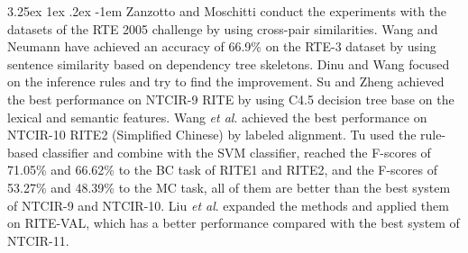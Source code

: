 \documentclass[12pt]{article}
\makeatletter
\renewcommand\paragraph{\@startsection{paragraph}{5}{\z@}%
  {3.25ex \@plus1ex \@minus.2ex}%
  {-1em}%
  {\normalfont\normalsize\bfseries}}
\makeatother
\begin{document}
\begin{CJK*}{UTF8}{bkai}
\begin{spacing}{1.77}
\paragraph{}
Zanzotto and Moschitti \cite{zanzotto_moschitti_2006} conduct the experiments with the datasets of the RTE 2005 challenge by using cross-pair similarities. Wang and Neumann \cite{wang_neumann_2007} have achieved an accuracy of 66.9\% on the RTE-3 dataset by using sentence similarity based on dependency tree skeletons. Dinu and Wang \cite{dinu_wang_2009} focused on the inference rules and try to find the improvement. Su and Zheng \cite{su_zheng_2011} achieved the best performance on NTCIR-9 RITE by using C4.5 decision tree base on the lexical and semantic features. Wang \emph{et al}. \cite{wang-etal-2013-labeled} achieved the best performance on NTCIR-10 RITE2 (Simplified Chinese) by labeled alignment. Tu \cite{tu_2015} used the rule-based classifier and combine with the SVM classifier, reached the F-scores of 71.05\% and 66.62\% to the BC task of RITE1 and RITE2, and the F-scores of 53.27\% and 48.39\% to the MC task, all of them are better than the best system of NTCIR-9 and NTCIR-10. Liu \emph{et al}. \cite{liu_2016_paper} expanded the methods and applied them on RITE-VAL, which has a better performance compared with the best system of NTCIR-11.


\end{spacing}
\end{CJK*}
\end{document}
